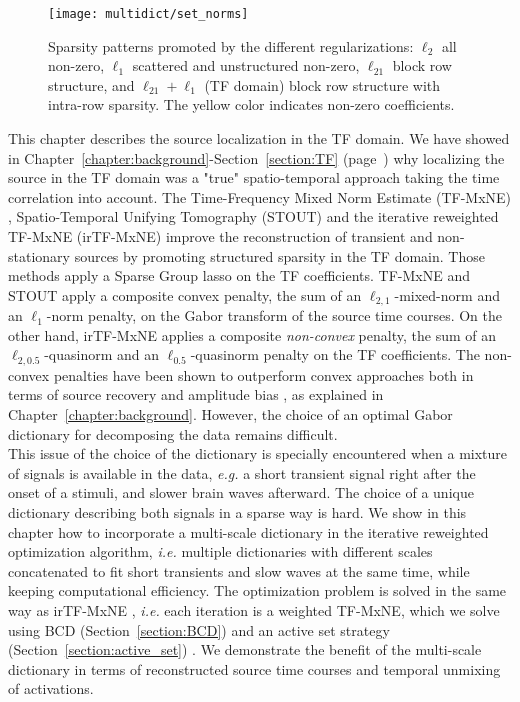 \begin{figure}
\centering
	\texttt{[image: multidict/set\_norms]}
    \caption{Sparsity patterns promoted by the different regularizations: $\ell_2$ all non-zero, $\ell_1$ scattered and unstructured non-zero, $\ell_{21}$ block row structure, and $\ell_{21} + \ell_1$ (TF domain) block row structure with intra-row sparsity. The yellow color indicates non-zero coefficients.}
    \label{fig:set_norms}
\end{figure}

This chapter describes the source localization in the \ac{TF} domain. We have showed in Chapter~\ref{chapter:background}-Section~\ref{section:TF} (page~\pageref{section:TF}) why localizing the source in the \ac{TF} domain was a "true" spatio-temporal approach taking the time correlation into account.
The Time-Frequency Mixed Norm Estimate (TF-MxNE) \cite{TF-MxNE}, Spatio-Temporal Unifying Tomography (STOUT) \cite{castano2015solving} and the iterative reweighted TF-MxNE (irTF-MxNE) \cite{irTF-MxNE} improve the reconstruction of transient and non-stationary sources by promoting structured sparsity in the TF domain. Those methods apply a Sparse Group \ac{lasso} on the TF coefficients. TF-MxNE and STOUT apply a composite convex penalty, the sum of an $\ell_{2, 1}$-mixed-norm and an $\ell_{1}$-norm penalty, on the Gabor transform of the source time courses. On the other hand, irTF-MxNE applies a composite \emph{non-convex} penalty, the sum of an $\ell_{2, 0.5}$-quasinorm and an $\ell_{0.5}$-quasinorm penalty on the TF coefficients.
The non-convex penalties have been shown to outperform convex approaches both in terms of source recovery and amplitude bias \cite{candes2008enhancing,daubechies2010iteratively}, as explained in Chapter~\ref{chapter:background}. However, the choice of an optimal Gabor dictionary for decomposing the data remains difficult.\\

This issue of the choice of the dictionary is specially encountered when a mixture of signals is available in the data, \textit{e.g.} a short transient signal right after the onset of a stimuli, and slower brain waves afterward. The choice of a unique dictionary describing both signals in a sparse way is hard. We show in this chapter how to incorporate a multi-scale dictionary in the iterative reweighted optimization algorithm, \textit{i.e.} multiple dictionaries with different scales concatenated to fit short transients and slow waves at the same time, while keeping computational efficiency. The optimization problem is solved in the same way as irTF-MxNE \cite{irTF-MxNE}, \textit{i.e.} each iteration is a weighted TF-MxNE, which we solve using \ac{BCD} (Section~\ref{section:BCD}) and an active set strategy (Section~\ref{section:active_set}) \cite{friedman2010regularization}. %
We demonstrate the benefit of the multi-scale dictionary in terms of reconstructed source time courses and temporal unmixing of activations.

